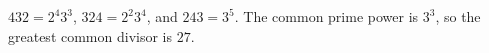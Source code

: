 $432=2^4 3^3$, $324=2^2 3^4$, and $243=3^5$. The common prime power is $3^3$, so the greatest common divisor is $\boxed{27}$.
